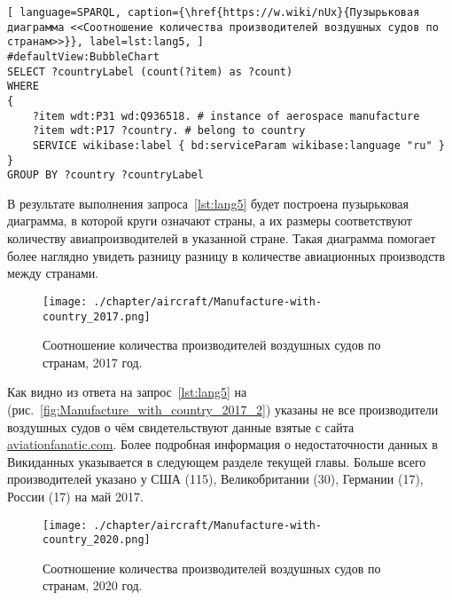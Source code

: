 \begin{lstlisting}[ language=SPARQL, caption={\href{https://w.wiki/nUx}{Пузырьковая диаграмма <<Соотношение количества производителей воздушных судов по странам>>}}, label=lst:lang5, ]
#defaultView:BubbleChart
SELECT ?countryLabel (count(?item) as ?count)
WHERE
{
    ?item wdt:P31 wd:Q936518. # instance of aerospace manufacture
  	?item wdt:P17 ?country. # belong to country
    SERVICE wikibase:label { bd:serviceParam wikibase:language "ru" }
}
GROUP BY ?country ?countryLabel
\end{lstlisting}

В результате выполнения запроса~\ref{lst:lang5} будет построена пузырьковая диаграмма, в которой круги означают страны, а их размеры соответствуют количеству авиапроизводителей в указанной стране. Такая диаграмма помогает более наглядно увидеть разницу разницу в количестве авиационных производств между странами.
 
\begin{figure}[h!]
\centering
	\texttt{[image: ./chapter/aircraft/Manufacture-with-country\_2017.png]}
	\caption{Соотношение количества производителей воздушных судов по странам, 2017 год.}
	\label{fig:Manufacture_with_country_2017}
\end{figure}

Как видно из ответа на запрос~\ref{lst:lang5} на (рис.~\ref{fig:Manufacture_with_country_2017_2}) указаны не все производители воздушных судов о чём свидетельствуют данные взятые с сайта \href{https://www.aviationfanatic.com/}{aviationfanatic.com}. Более подробная информация о недостаточности данных в Викиданных указывается в следующем разделе текущей главы. Больше всего производителей указано у США (115), Великобритании (30), Германии (17), России (17) на май 2017.

\begin{figure}[h!]
\centering
	\texttt{[image: ./chapter/aircraft/Manufacture-with-country\_2020.png]}
	\caption{Соотношение количества производителей воздушных судов по странам, 2020 год.}
	\label{fig:Manufacture_with_country_2020}
\end{figure}

\label{fig:Manufacture_with_country_2017_2}

\label{aircraft_question_4}


